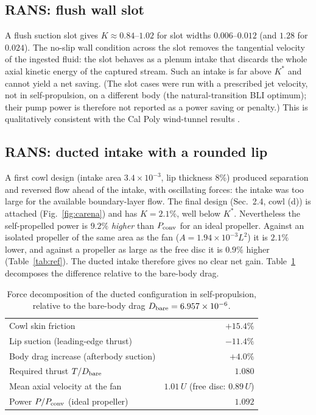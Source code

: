 \documentclass[11pt,a4paper]{article}
\begin{document}
\subsection{RANS: flush wall slot}
A flush suction slot gives $K\approx0.84$--$1.02$ for slot widths $0.006$--$0.012$ (and
$1.28$ for $0.024$). The no-slip wall condition across the slot removes the tangential
velocity of the ingested fluid: the slot behaves as a plenum intake that discards the
whole axial kinetic energy of the captured stream. Such an intake is far above $K^*$ and
cannot yield a net saving. (The slot cases were run with a prescribed jet velocity, not
in self-propulsion, on a different body (the natural-transition BLI optimum); their pump
power is therefore not reported as a power saving or penalty.) This is qualitatively
consistent with the Cal Poly wind-tunnel results \cite{roepke2012}.

\subsection{RANS: ducted intake with a rounded lip}
A first cowl design (intake area $3.4\times10^{-3}$, lip thickness 8\%) produced separation
and reversed flow ahead of the intake, with oscillating forces: the intake was too large
for the available boundary-layer flow. The final design (Sec.~2.4, cowl (d)) is attached
(Fig.~\ref{fig:carena}) and has $K=2.1\%$, well below $K^*$. Nevertheless the
self-propelled power is $9.2\%$ \emph{higher} than $P_{\rm conv}$ for an ideal propeller.
Against an isolated propeller of the same area as the fan ($A=1.94\times10^{-3}L^2$) it is
$2.1\%$ lower, and against a propeller as large as the free disc it is $0.9\%$ higher
(Table~\ref{tab:ref}). The ducted intake therefore gives no clear net gain.
Table~\ref{tab:budget} decomposes the difference relative to the bare-body drag.

\begin{table}[h]\centering
\caption{Force decomposition of the ducted configuration in self-propulsion, relative to
the bare-body drag $D_{\rm bare}=6.957\times10^{-6}$.}\label{tab:budget}
\begin{tabular}{lr}
\toprule
Cowl skin friction & $+15.4\%$\\
Lip suction (leading-edge thrust) & $-11.4\%$\\
Body drag increase (afterbody suction) & $+4.0\%$\\
\midrule
Required thrust $T/D_{\rm bare}$ & $1.080$\\
Mean axial velocity at the fan & $1.01\,U$ (free disc: $0.89\,U$)\\
Power $P/P_{\rm conv}$ (ideal propeller) & $1.092$\\
\bottomrule
\end{tabular}
\end{table}
\end{document}
